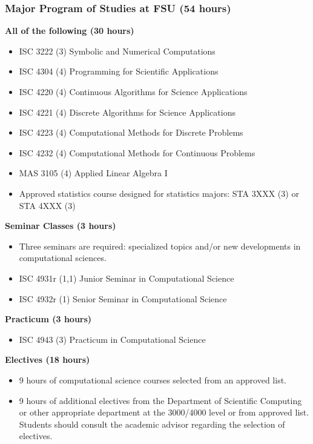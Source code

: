 \documentclass[12pt,a4paper]{article}
\begin{document}
\subsubsection*{Major Program of Studies at FSU (54 hours)}
\textbf{All of the following (30 hours)}
\begin{itemize}
    \item ISC 3222 (3) Symbolic and Numerical Computations
    \item ISC 4304 (4) Programming for Scientific Applications
    \item ISC 4220 (4) Continuous Algorithms for Science Applications
    \item ISC 4221 (4) Discrete Algorithms for Science Applications
    \item ISC 4223 (4) Computational Methods for Discrete Problems
    \item ISC 4232 (4) Computational Methods for Continuous Problems
    \item MAS 3105 (4) Applied Linear Algebra I
    \item Approved statistics course designed for statistics majors: STA 3XXX (3) or STA 4XXX (3)
\end{itemize}
\textbf{Seminar Classes (3 hours)}
\begin{itemize}
    \item Three seminars are required: specialized topics and/or new developments in computational sciences.
    \item ISC 4931r (1,1) Junior Seminar in Computational Science
    \item ISC 4932r (1) Senior Seminar in Computational Science
\end{itemize}
\textbf{Practicum (3 hours)}
\begin{itemize}
    \item ISC 4943 (3) Practicum in Computational Science
\end{itemize}
\textbf{Electives (18 hours)}
\begin{itemize}
    \item 9 hours of computational science courses selected from an approved list.
    \item 9 hours of additional electives from the Department of Scientific Computing or other appropriate department at the 3000/4000 level or from approved list. Students should consult the academic advisor regarding the selection of electives.
\end{itemize}
\end{document}
